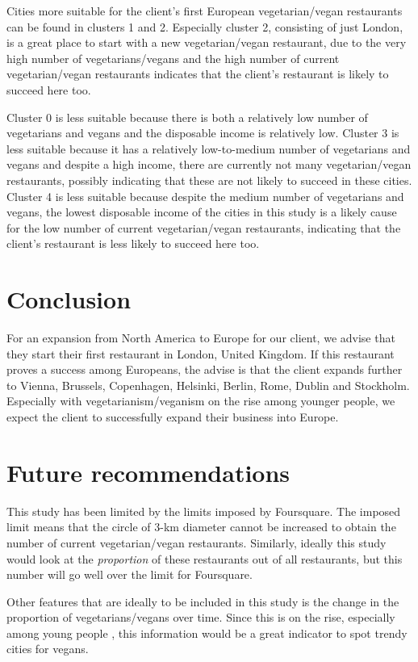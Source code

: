 \documentclass[12pt,a4paper]{article}
\begin{document}
Cities more suitable for the client's first European vegetarian/vegan restaurants can be found in clusters 1 and 2. Especially cluster 2, consisting of just London, is a great place to start with a new vegetarian/vegan restaurant, due to the very high number of vegetarians/vegans and the high number of current vegetarian/vegan restaurants indicates that the client's restaurant is likely to succeed here too.

Cluster 0 is less suitable because there is both a relatively low number of vegetarians and vegans and the disposable income is relatively low. Cluster 3 is less suitable because it has a relatively low-to-medium number of vegetarians and vegans and despite a high income, there are currently not many vegetarian/vegan restaurants, possibly indicating that these are not likely to succeed in these cities. Cluster 4 is less suitable because despite the medium number of vegetarians and vegans, the lowest disposable income of the cities in this study is a likely cause for the low number of current vegetarian/vegan restaurants, indicating that the client's restaurant is less likely to succeed here too. 


\section{Conclusion}
\label{sec:conclusion}
For an expansion from North America to Europe for our client, we advise that they start their first restaurant in London, United Kingdom. If this restaurant proves a success among Europeans, the advise is that the client expands further to Vienna, Brussels, Copenhagen, Helsinki, Berlin, Rome, Dublin and Stockholm. Especially with vegetarianism/veganism on the rise \cite{wikiVega} among younger people, we expect the client to successfully expand their business into Europe. 

\section{Future recommendations}
This study has been limited by the limits imposed by Foursquare. The imposed limit means that the circle of 3-km diameter cannot be increased to obtain the number of current vegetarian/vegan restaurants. Similarly, ideally this study would look at the \textit{proportion} of these restaurants out of all restaurants, but this number will go well over the limit for Foursquare. 

Other features that are ideally to be included in this study is the change in the proportion of vegetarians/vegans over time. Since this is on the rise, especially among young people \cite{wikiVega}, this information would be a great indicator to spot trendy cities for vegans. 


\newpage
\appendix
 

\end{document}
